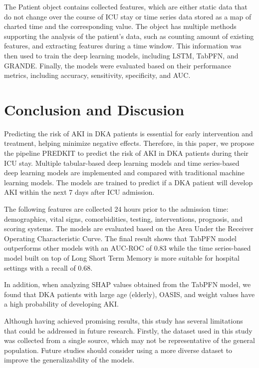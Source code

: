 \documentclass[sn-mathphys-num]{sn-jnl}%
\theoremstyle{thmstyleone}%
\theoremstyle{thmstyletwo}%
\theoremstyle{thmstylethree}%
\begin{document}
The Patient object contains collected features, which are either static data that do not change over the course of ICU stay or time series data stored as a map of charted time and the corresponding value.
The object has multiple methods supporting the analysis of the patient's data, such as counting amount of existing features, and extracting features during a time window.
This information was then used to train the deep learning models, including LSTM, TabPFN, and GRANDE.
Finally, the models were evaluated based on their performance metrics, including accuracy, sensitivity, specificity, and AUC.

\section{Conclusion and Discusion}
\label{sec:conclusion}
Predicting the risk of AKI in DKA patients is essential for early intervention and treatment, helping minimize negative effects.
Therefore, in this paper, we propose the pipeline PREDKIT to predict the risk of AKI in DKA patients during their ICU stay.
Multiple tabular-based deep learning models and time series-based deep learning models are implemented and compared with traditional machine learning models.
The models are trained to predict if a DKA patient will develop AKI within the next 7 days after ICU admission.

The following features are collected 24 hours prior to the admission time: demographics, vital signs, comorbidities, testing, interventions, prognosis, and scoring systems. 
The models are evaluated based on the Area Under the Receiver Operating Characteristic Curve. 
The final result shows that TabPFN model outperforms other models with an AUC-ROC of 0.83 while the time series-based model built on top of Long Short Term Memory is more suitable for hospital settings with a recall of 0.68.


In addition, when analyzing SHAP values obtained from the TabPFN model, we found that DKA patients with large age (elderly), OASIS, and weight values have a high probability of developing AKI.

Although having achieved promising results, this study has several limitations that could be addressed in future research.
Firstly, the dataset used in this study was collected from a single source, which may not be representative of the general population.
Future studies should consider using a more diverse dataset to improve the generalizability of the models.
\end{document}
